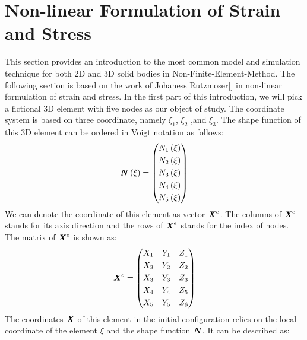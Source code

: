 \section{Non-linear Formulation of Strain and Stress}
This section provides an introduction to the most common model and simulation technique for both 2D and 3D solid bodies in Non-Finite-Element-Method. The following section is based on the work of Johaness Rutzmoser[\cite{Johannes}] in non-linear formulation of strain and stress. In the first part of this introduction, we will pick a fictional 3D element with five nodes as our object of study. The coordinate system is based on three coordinate, namely $\xi_1$, $\xi_2$ ,and $\xi_3$. The shape function of this 3D element can be ordered in Voigt notation as follows:
\begin{equation}
 \textbf{\textit{N}}\left(\xi\right) = \begin{pmatrix}
 N_1\left(\xi\right)           \\[0.3em]
 N_2\left(\xi\right)            \\[0.3em]
 N_3\left(\xi\right)           \\[0.3em]
 N_4\left(\xi\right)         \\[0.3em]
 N_5\left(\xi\right)                            
\end{pmatrix}
\end{equation}
We can denote the coordinate of this element as vector $\textbf{\textit{X}}^e$. The columns of $\textbf{\textit{X}}^e$ stands for its axis direction and the rows of $\textbf{\textit{X}}^e$ stands for the index of nodes. The matrix of $\textbf{\textit{X}}^e$ is shown as:
\begin{equation}
\textbf{\textit{X}}^e = \begin{pmatrix}
X_1 & Y_1 & Z_1           \\[0.3em]
X_2 & Y_2 & Z_2             \\[0.3em]
X_3 & Y_3 & Z_3           \\[0.3em]
X_4 & Y_4 & Z_5          \\[0.3em]
X_5 & Y_5 & Z_6                            
\end{pmatrix}
\end{equation}	
The coordinates $\textbf{\textit{X}}$ of this element in the initial configuration relies on the local coordinate of the element $\xi$ and the shape function $\textbf{\textit{N}}$. It can be described as:
